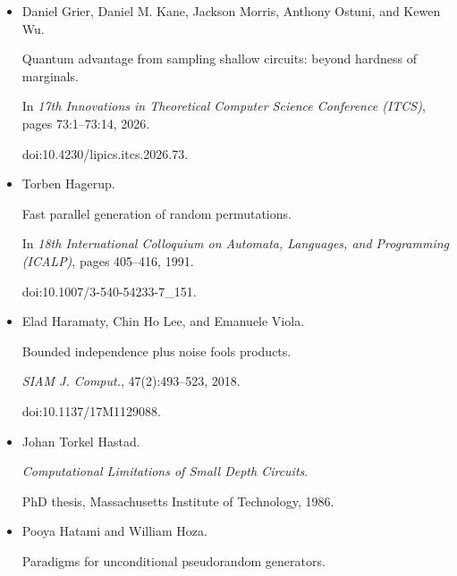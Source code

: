 \begin{itemize}
\emph{ACM Trans. Comput. Theory}, 12(3):20:1–20:13, 2020.


doi:10.1145/3404858.





\item[] 
[21]

Daniel Grier, Daniel M. Kane, Jackson Morris, Anthony Ostuni, and Kewen Wu.


Quantum advantage from sampling shallow circuits: beyond hardness of
marginals.


In \emph{17th Innovations in Theoretical Computer Science Conference
(ITCS)}, pages 73:1–73:14, 2026.


doi:10.4230/lipics.itcs.2026.73.





\item[] 
[22]

Torben Hagerup.


Fast parallel generation of random permutations.


In \emph{18th International Colloquium on Automata, Languages, and
Programming (ICALP)}, pages 405–416, 1991.


doi:10.1007/3-540-54233-7\_151.





\item[] 
[23]

Elad Haramaty, Chin Ho Lee, and Emanuele Viola.


Bounded independence plus noise fools products.


\emph{SIAM J. Comput.}, 47(2):493–523, 2018.


doi:10.1137/17M1129088.





\item[] 
[24]

Johan Torkel Hastad.


\emph{Computational Limitations of Small Depth Circuits}.


PhD thesis, Massachusetts Institute of Technology, 1986.





\item[] 
[25]

Pooya Hatami and William Hoza.


Paradigms for unconditional pseudorandom generators.



\end{itemize}
